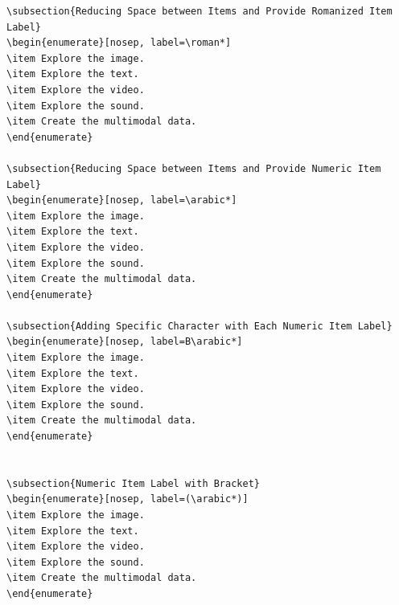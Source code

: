 \documentclass{article}
\begin{document}
\begin{lstlisting}
\subsection{Reducing Space between Items and Provide Romanized Item Label}
\begin{enumerate}[nosep, label=\roman*]
\item Explore the image.
\item Explore the text.
\item Explore the video.
\item Explore the sound.
\item Create the multimodal data.
\end{enumerate}

\subsection{Reducing Space between Items and Provide Numeric Item Label}
\begin{enumerate}[nosep, label=\arabic*]
\item Explore the image.
\item Explore the text.
\item Explore the video.
\item Explore the sound.
\item Create the multimodal data.
\end{enumerate}

\subsection{Adding Specific Character with Each Numeric Item Label}
\begin{enumerate}[nosep, label=B\arabic*]
\item Explore the image.
\item Explore the text.
\item Explore the video.
\item Explore the sound.
\item Create the multimodal data.
\end{enumerate}


\subsection{Numeric Item Label with Bracket}
\begin{enumerate}[nosep, label=(\arabic*)]
\item Explore the image.
\item Explore the text.
\item Explore the video.
\item Explore the sound.
\item Create the multimodal data.
\end{enumerate}



\end{lstlisting}
\end{document}
